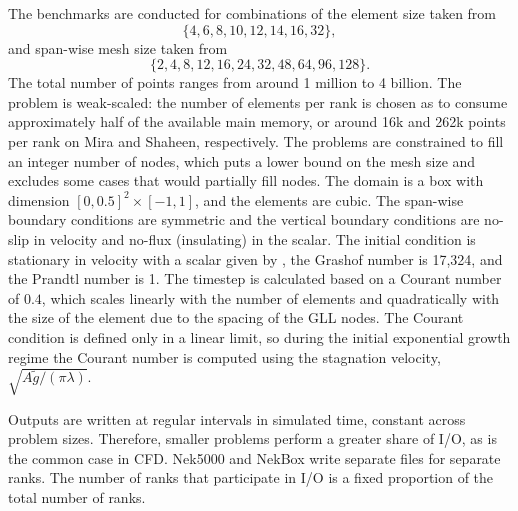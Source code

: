 The benchmarks are conducted for combinations of the element size taken from
\begin{equation}
\{4, 6, 8, 10, 12, 14, 16, 32\},
\end{equation}
and span-wise mesh size taken from 
\begin{equation}
\{2, 4, 8, 12, 16, 24, 32, 48, 64, 96, 128\}.
\end{equation}
The total number of points ranges from around 1 million to 4 billion.
The problem is weak-scaled: the number of elements per rank is chosen as to consume approximately half of the available main memory, or around 16k and 262k points per rank on Mira and Shaheen, respectively.
The problems are constrained to fill an integer number of nodes, which puts a lower bound on the mesh size and excludes some cases that would partially fill nodes.
The domain is a box with dimension $[0,0.5]^2 \times [-1,1]$, and the elements are cubic.
The span-wise boundary conditions are symmetric and the vertical boundary conditions are no-slip in velocity and no-flux (insulating) in the scalar.
The initial condition is stationary in velocity with a scalar given by , the Grashof number is 17,324, and the Prandtl number is 1.
The timestep is calculated based on a Courant number of $0.4$, which scales linearly with the number of elements and quadratically with the size of the element due to the spacing of the GLL nodes.
The Courant condition is defined only in a linear limit, so during the initial exponential growth regime the Courant number is computed using the stagnation velocity, $\sqrt{A \tilde{g}/(\pi \lambda)}$.


Outputs are written at regular intervals in simulated time, constant across problem sizes.
Therefore, smaller problems perform a greater share of I/O, as is the common case in CFD.
Nek5000 and NekBox write separate files for separate ranks.
The number of ranks that participate in I/O is a fixed proportion of the total number of ranks.


